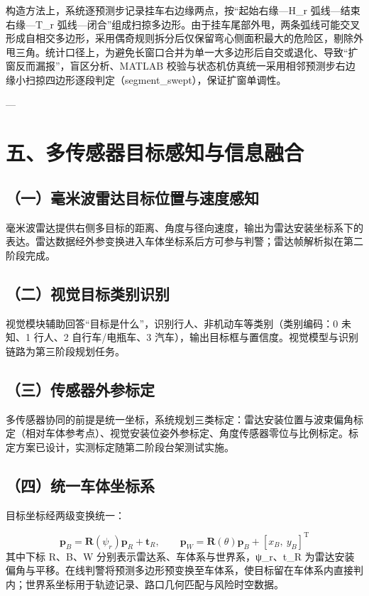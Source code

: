 \documentclass[UTF8,11pt]{ctexart}
\begin{document}
构造方法上，系统逐预测步记录挂车右边缘两点，按“起始右缘—H\_r 弧线—结束右缘—T\_r 弧线—闭合”组成扫掠多边形。由于挂车尾部外甩，两条弧线可能交叉形成自相交多边形，采用偶奇规则拆分后仅保留弯心侧面积最大的危险区，剔除外甩三角。统计口径上，为避免长窗口合并为单一大多边形后自交或退化、导致“扩窗反而漏报”，盲区分析、MATLAB 校验与状态机仿真统一采用相邻预测步右边缘小扫掠四边形逐段判定（segment\_swept），保证扩窗单调性。

---

\section*{五、多传感器目标感知与信息融合}
\subsection*{（一）毫米波雷达目标位置与速度感知}
毫米波雷达提供右侧多目标的距离、角度与径向速度，输出为雷达安装坐标系下的表达。雷达数据经外参变换进入车体坐标系后方可参与判警；雷达帧解析拟在第二阶段完成。

\subsection*{（二）视觉目标类别识别}
视觉模块辅助回答“目标是什么”，识别行人、非机动车等类别（类别编码：0 未知、1 行人、2 自行车/电瓶车、3 汽车），输出目标框与置信度。视觉模型与识别链路为第三阶段规划任务。

\subsection*{（三）传感器外参标定}
多传感器协同的前提是统一坐标，系统规划三类标定：雷达安装位置与波束偏角标定（相对车体参考点）、视觉安装位姿外参标定、角度传感器零位与比例标定。标定方案已设计，实测标定随第二阶段台架测试实施。

\subsection*{（四）统一车体坐标系}
目标坐标经两级变换统一：

\begin{equation}
\boldsymbol{p}_B = \boldsymbol{R}(\psi_r)\boldsymbol{p}_R + \boldsymbol{t}_R,\qquad \boldsymbol{p}_W = \boldsymbol{R}(\theta)\boldsymbol{p}_B + [x_B,\ y_B]^{\mathrm{T}} 
\end{equation}
其中下标 R、B、W 分别表示雷达系、车体系与世界系，ψ\_r、t\_R 为雷达安装偏角与平移。在线判警将预测多边形预变换至车体系，使目标留在车体系内直接判内；世界系坐标用于轨迹记录、路口几何匹配与风险时空数据。
\end{document}
